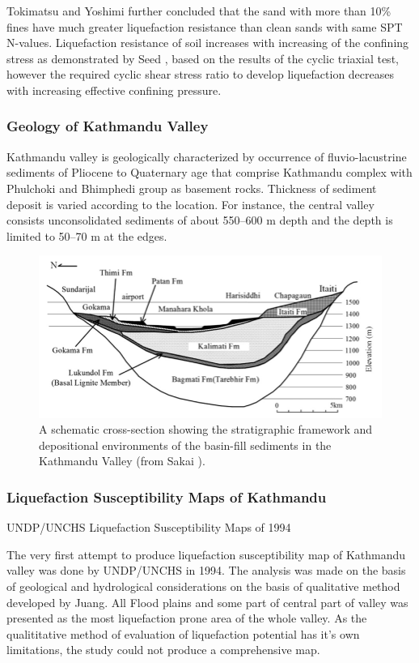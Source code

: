 Tokimatsu and Yoshimi \cite{r17} further concluded that the sand with more than 10\% fines have much greater liquefaction resistance than clean sands with same SPT N-values. Liquefaction resistance of soil increases with increasing of the confining stress as demonstrated by Seed \cite{r16}, based on the results of the cyclic triaxial test, however the required cyclic shear stress ratio to develop liquefaction decreases with increasing effective confining pressure.

\subsubsection{Geology of Kathmandu Valley}
Kathmandu valley is geologically characterized by occurrence of fluvio-lacustrine sediments of Pliocene to Quaternary age that comprise Kathmandu complex with Phulchoki and Bhimphedi group as basement rocks. Thickness of sediment deposit is varied according to the location. For instance, the central valley consists unconsolidated sediments of about 550–600 m depth and the depth is limited to 50–70 m at the edges. 

\begin{figure}[!hbt]
\centering
\includegraphics[width=0.5\linewidth,keepaspectratio]{images/main/geological_cross_section.png}
\caption{A schematic cross-section showing the stratigraphic framework and depositional environments of the basin-fill sediments in the Kathmandu Valley (from Sakai \cite{r24}).}
\end{figure}

\subsubsection{Liquefaction Susceptibility Maps of Kathmandu}
UNDP/UNCHS Liquefaction Susceptibility Maps of 1994

The very first attempt to produce liquefaction susceptibility map of Kathmandu valley was done by UNDP/UNCHS in 1994. The analysis was made on the basis of geological and hydrological considerations on the basis of qualitative method developed by Juang\cite{r25}. All Flood plains and some part of central part of valley was presented as the most liquefaction prone area of the whole valley.  As the qualititative method of evaluation of liquefaction potential has it’s own limitations, the study could not produce a comprehensive  map.

